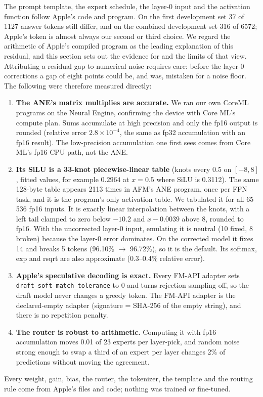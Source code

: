 \documentclass[11pt,reqno]{amsart}
\newcommand{\code}[1]{\texttt{#1}}
\theoremstyle{definition}
\begin{document}
The prompt template, the expert schedule, the layer-0 input and the activation function follow Apple's code and program. On the first development set 37 of 1127 answer tokens still differ, and on the combined development set 316 of 6572; Apple's token is almost always our second or third choice. We regard the arithmetic of Apple's compiled program as the leading explanation of this residual, and this section sets out the evidence for and the limits of that view. Attributing a residual gap to numerical noise requires care: before the layer-0 corrections a gap of eight points could be, and was, mistaken for a noise floor. The following were therefore measured directly:
\begin{enumerate}
\item \textbf{The ANE's matrix multiplies are accurate.} We ran our own CoreML programs on the Neural Engine, confirming the device with Core ML's compute plan. Sums accumulate at high precision and only the fp16 output is rounded (relative error $2.8\times10^{-4}$, the same as fp32 accumulation with an fp16 result). The low-precision accumulation one first sees comes from Core ML's fp16 CPU path, not the ANE.
\item \textbf{Its SiLU is a 33-knot piecewise-linear table} (knots every 0.5 on $[-8,8]$, fitted values, for example $0.2964$ at $x=0.5$ where SiLU is 0.3112). The same 128-byte table appears 2113 times in AFM's ANE program, once per FFN task, and it is the program's only activation table. We tabulated it for all 65\,536 fp16 inputs. It is exactly linear interpolation between the knots, with a left tail clamped to zero below $-10.2$ and $x-0.0039$ above 8, rounded to fp16. With the uncorrected layer-0 input, emulating it is neutral (10 fixed, 8 broken) because the layer-0 error dominates. On the corrected model it fixes 14 and breaks 5 tokens (96.10\% $\to$ 96.72\%), so it is the default. Its softmax, exp and rsqrt are also approximate (0.3--0.4\% relative error).
\item \textbf{Apple's speculative decoding is exact.} Every FM-API adapter sets \code{draft\_soft\_match\_tolerance} to 0 and turns rejection sampling off, so the draft model never changes a greedy token. The FM-API adapter is the declared-empty adapter (signature = SHA-256 of the empty string), and there is no repetition penalty.
\item \textbf{The router is robust to arithmetic.} Computing it with fp16 accumulation moves 0.01 of 23 experts per layer-pick, and random noise strong enough to swap a third of an expert per layer changes 2\% of predictions without moving the agreement.
\end{enumerate}
Every weight, gain, bias, the router, the tokenizer, the template and the routing rule come from Apple's files and code; nothing was trained or fine-tuned.
\end{document}
